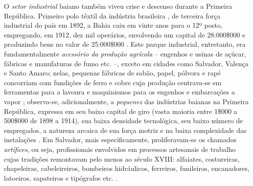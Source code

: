 O \textit{setor industrial} baiano também viveu crise e descenso durante a Primeira República. Primeiro polo têxtil da indústria brasileira \cite{stein_textil_1979}, de terceira força industrial do país em 1892, a Bahia caiu em vinte anos para o 12º posto, empregando, em 1912, dez mil operários, envolvendo um capital de 28:000\$000 e produzindo bens no valor de 25:000\$000 \cite[p.~29-30]{CPE1980}. Este parque industrial, entretanto, era fundamentalmente \textit{acessório da produção agrícola} -- engenhos e usinas de açúcar, fábricas e manufaturas de fumo etc. --, exceto em cidades como Salvador, Valença e Santo Amaro; nelas, pequenas fábricas de sabão, papel, pólvora e rapé concorriam com fundições de ferro e cobre cuja produção centrava-se em ferramentas para a lavoura e maquinismos para os engenhos e embarcações a vapor \cite[p.~30]{CPE1980}; observa-se, adicionalmente, a \textit{pequenez} das indústrias baianas na Primeira República, expressa em seu baixo capital de giro (vasta maioria entre 1\$000 a 500\$000 de 1898 a 1914), sua baixa densidade tecnológica, seu baixo número de empregados, a natureza arcaica de sua força motriz e na baixa complexidade das instalações \cite[p.~55]{CPE1980}. Em Salvador, mais especificamente, proliferavam-se os chamados \textit{artífices}, ou seja, profissionais envolvidos em processos artesanais de trabalho cujas tradições remontavam pelo menos ao século XVIII: alfaiates, costureiras, chapeleiras, cabeleireiros, bombeiros hidráulicos, ferreiros, funileiros, encanadores, latoeiros, sapateiros e tipógrafos etc. \cite{CPE1980,REIS2012}.

